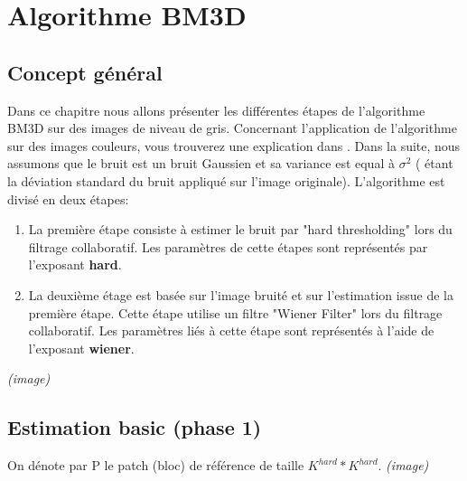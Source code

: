 
\chapter{Algorithme BM3D}
\section{Concept général}
Dans ce chapitre nous allons présenter les différentes étapes de l'algorithme BM3D sur des images de niveau de gris. Concernant l'application de l'algorithme sur des images couleurs, vous trouverez une explication dans \cite{2}. Dans la suite, nous assumons que le bruit est un bruit Gaussien et sa variance est equal à \(\sigma^2\) (\sigma \: étant la déviation standard du bruit appliqué sur l'image originale).
\newline
\newline
L'algorithme est divisé en deux étapes:
\newline
\newline
\begin{enumerate}
\item La première étape consiste à estimer le bruit par "hard thresholding" lors du filtrage collaboratif. Les paramètres de cette étapes sont représentés par l'exposant \textbf{hard}.
\item La deuxième étage est basée sur l'image bruité et sur l'estimation issue de la première étape. Cette étape utilise un filtre "Wiener Filter" lors du filtrage collaboratif. Les paramètres liés à cette étape sont représentés à l'aide de l'exposant \textbf{wiener}.
\end{enumerate}
\textit{\small{(image)}}
\newpage

\section{Estimation basic (phase 1)}
On dénote par P le patch (bloc) de référence de taille \(K^{hard} * K^{hard}\).
\newline
\newline
\textit{\small{(image)}}
